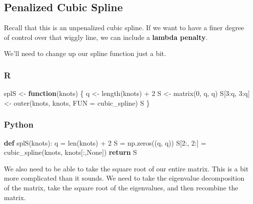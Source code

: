 \documentclass[
  letterpaper,
]{krantz}
\newenvironment{Shaded}{}{}
\newcommand{\AttributeTok}[1]{\textcolor[rgb]{0.49,0.56,0.16}{#1}}
\newcommand{\BuiltInTok}[1]{\textcolor[rgb]{0.00,0.50,0.00}{#1}}
\newcommand{\ControlFlowTok}[1]{\textcolor[rgb]{0.00,0.44,0.13}{\textbf{#1}}}
\newcommand{\DecValTok}[1]{\textcolor[rgb]{0.25,0.63,0.44}{#1}}
\newcommand{\FunctionTok}[1]{\textcolor[rgb]{0.02,0.16,0.49}{#1}}
\newcommand{\KeywordTok}[1]{\textcolor[rgb]{0.00,0.44,0.13}{\textbf{#1}}}
\newcommand{\NormalTok}[1]{#1}
\newcommand{\OperatorTok}[1]{\textcolor[rgb]{0.40,0.40,0.40}{#1}}
\newcommand{\OtherTok}[1]{\textcolor[rgb]{0.00,0.44,0.13}{#1}}
\newcommand{\SpecialCharTok}[1]{\textcolor[rgb]{0.25,0.44,0.63}{#1}}
\newcommand{\VariableTok}[1]{\textcolor[rgb]{0.10,0.09,0.49}{#1}}
\begin{document}
\subsection{Penalized Cubic Spline}\label{penalized-cubic-spline}

Recall that this is an unpenalized cubic spline. If we want to have a
finer degree of control over that wiggly line, we can include a
\textbf{lambda penalty}.

We'll need to change up our spline function just a bit.

\subsubsection{R}

\begin{Shaded}
\begin{Highlighting}[]
\NormalTok{splS }\OtherTok{\textless{}{-}} \ControlFlowTok{function}\NormalTok{(knots) \{}
\NormalTok{  q }\OtherTok{\textless{}{-}} \FunctionTok{length}\NormalTok{(knots) }\SpecialCharTok{+} \DecValTok{2}
\NormalTok{  S }\OtherTok{\textless{}{-}} \FunctionTok{matrix}\NormalTok{(}\DecValTok{0}\NormalTok{, q, q) }
\NormalTok{  S[}\DecValTok{3}\SpecialCharTok{:}\NormalTok{q, }\DecValTok{3}\SpecialCharTok{:}\NormalTok{q] }\OtherTok{\textless{}{-}} \FunctionTok{outer}\NormalTok{(knots, knots, }\AttributeTok{FUN =}\NormalTok{ cubic\_spline)}
\NormalTok{  S}
\NormalTok{\}}
\end{Highlighting}
\end{Shaded}

\subsubsection{Python}

\begin{Shaded}
\begin{Highlighting}[]
\KeywordTok{def}\NormalTok{ splS(knots):}
\NormalTok{    q }\OperatorTok{=} \BuiltInTok{len}\NormalTok{(knots) }\OperatorTok{+} \DecValTok{2}
\NormalTok{    S }\OperatorTok{=}\NormalTok{ np.zeros((q, q))}
\NormalTok{    S[}\DecValTok{2}\NormalTok{:, }\DecValTok{2}\NormalTok{:] }\OperatorTok{=}\NormalTok{ cubic\_spline(knots, knots[:,}\VariableTok{None}\NormalTok{])}
    \ControlFlowTok{return}\NormalTok{ S}
\end{Highlighting}
\end{Shaded}

We also need to be able to take the square root of our entire matrix.
This is a bit more complicated than it sounds. We need to take the
eigenvalue decomposition of the matrix, take the square root of the
eigenvalues, and then recombine the matrix.
\end{document}
